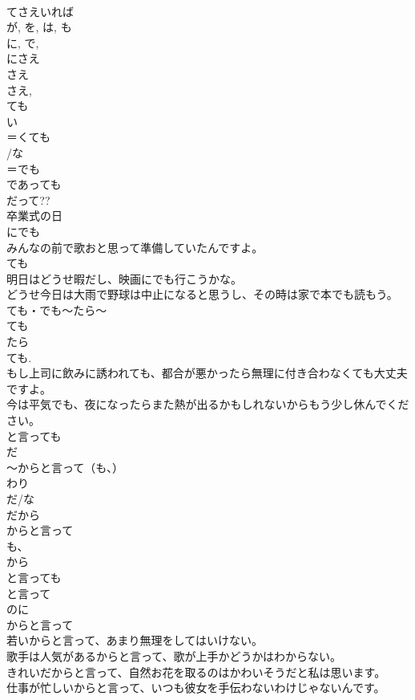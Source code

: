 \documentclass[8pt]{extreport}
\begin{document}
\begin{CJK}{UTF8}{min}
\\	てさえいれば
\\	が, を, は, も 
\\	に, で, 
\\	にさえ
\\	さえ 
\\	さえ, 
\\	ても
\\	い
\\	＝くても
\\	/な
\\	＝でも 
\\	であっても
\\	だって?? 
\\	卒業式の日
\\	にでも
\\	みんなの前で歌おと思って準備していたんですよ。
\\	ても 
\\	明日はどうせ暇だし、映画にでも行こうかな。
\\	どうせ今日は大雨で野球は中止になると思うし、その時は家で本でも読もう。
\\	ても・でも～たら～
\\	ても 
\\	たら 
\\	ても.
\\	もし上司に飲みに誘われても、都合が悪かったら無理に付き合わなくても大丈夫ですよ。
\\	今は平気でも、夜になったらまた熱が出るかもしれないからもう少し休んでください。
\\	と言っても
\\	だ 
\\	～からと言って（も、）
\\	わり 
\\	だ/な
\\	だから
\\	からと言って
\\	も、　
\\	から
\\	と言っても
\\	と言って 
\\	のに 
\\	からと言って
\\	若いからと言って、あまり無理をしてはいけない。
\\	歌手は人気があるからと言って、歌が上手かどうかはわからない。
\\	きれいだからと言って、自然お花を取るのはかわいそうだと私は思います。
\\	仕事が忙しいからと言って、いつも彼女を手伝わないわけじゃないんです。

\end{CJK}
\end{document}
